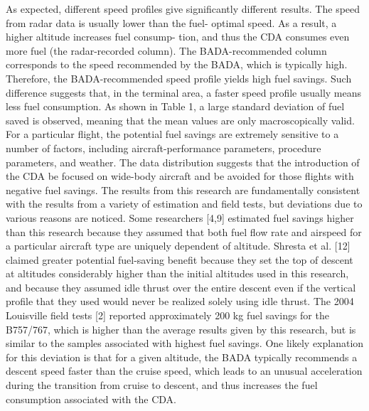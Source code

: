 \documentclass{aer1315-pretty}
\begin{document}
\begin{itemize}
   As expected, different speed profiles give significantly different
results. The speed from radar data is usually lower than the fuel-
optimal speed. As a result, a higher altitude increases fuel consump-
tion, and thus the CDA consumes even more fuel (the radar-recorded
column). The BADA-recommended column corresponds to the
speed recommended by the BADA, which is typically high.
Therefore, the BADA-recommended speed profile yields high fuel
savings. Such difference suggests that, in the terminal area, a faster
speed profile usually means less fuel consumption. As shown in
Table 1, a large standard deviation of fuel saved is observed, meaning
that the mean values are only macroscopically valid. For a particular
flight, the potential fuel savings are extremely sensitive to a number
of factors, including aircraft-performance parameters, procedure
parameters, and weather. The data distribution suggests that the
introduction of the CDA be focused on wide-body aircraft and
be avoided for those flights with negative fuel savings.
   The results from this research are fundamentally consistent with
the results from a variety of estimation and field tests, but deviations
due to various reasons are noticed. Some researchers [4,9] estimated
fuel savings higher than this research because they assumed that both
fuel flow rate and airspeed for a particular aircraft type are uniquely
dependent of altitude. Shresta et al. [12] claimed greater potential
fuel-saving benefit because they set the top of descent at altitudes
considerably higher than the initial altitudes used in this research,
and because they assumed idle thrust over the entire descent even
if the vertical profile that they used would never be realized solely
using idle thrust. The 2004 Louisville field tests [2] reported
approximately 200 kg fuel savings for the B757/767, which is higher
than the average results given by this research, but is similar to the
samples associated with highest fuel savings. One likely explanation
for this deviation is that for a given altitude, the BADA typically
recommends a descent speed faster than the cruise speed, which leads
to an unusual acceleration during the transition from cruise to
descent, and thus increases the fuel consumption associated with the
CDA.



\end{itemize}
\end{document}
